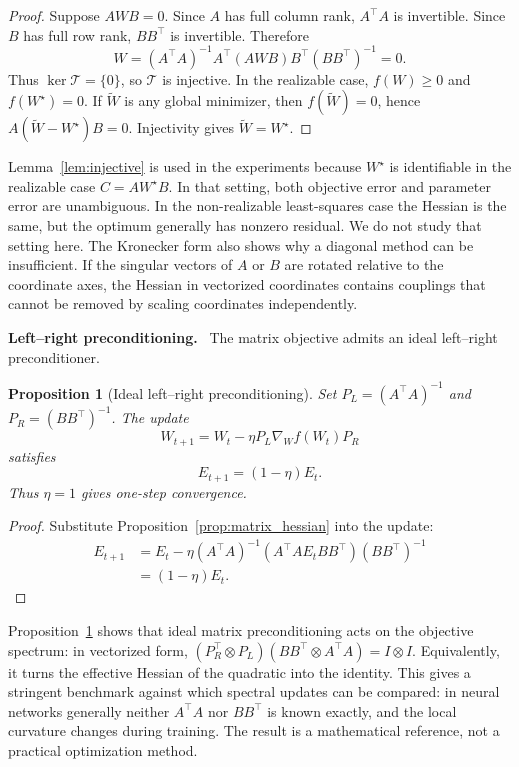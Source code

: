 \documentclass[sigconf,nonacm]{acmart}
\newcommand{\vpara}[1]{\par\noindent\textbf{#1.}\ }
\newtheorem{proposition}{Proposition}
\begin{document}
\begin{proof}
Suppose $AWB=0$. Since $A$ has full column rank, $A^\top A$ is invertible. Since $B$ has full row rank, $BB^\top$ is invertible. Therefore
\begin{equation}
  W=(A^\top A)^{-1}A^\top(AWB)B^\top(BB^\top)^{-1}=0.
\end{equation}
Thus $\ker\mathcal{T}=\{0\}$, so $\mathcal{T}$ is injective. In the realizable case, $f(W)\ge0$ and $f(W^\star)=0$. If $\widetilde W$ is any global minimizer, then $f(\widetilde W)=0$, hence $A(\widetilde W-W^\star)B=0$. Injectivity gives $\widetilde W=W^\star$.
\end{proof}

Lemma~\ref{lem:injective} is used in the experiments because $W^\star$ is identifiable in the realizable case $C=AW^\star B$. In that setting, both objective error and parameter error are unambiguous. In the non-realizable least-squares case the Hessian is the same, but the optimum generally has nonzero residual. We do not study that setting here. The Kronecker form also shows why a diagonal method can be insufficient. If the singular vectors of $A$ or $B$ are rotated relative to the coordinate axes, the Hessian in vectorized coordinates contains couplings that cannot be removed by scaling coordinates independently.

\vpara{Left--right preconditioning} The matrix objective admits an ideal left--right preconditioner.

\begin{proposition}[Ideal left--right preconditioning]\label{prop:lr}
Set $P_L=(A^\top A)^{-1}$ and $P_R=(BB^\top)^{-1}$. The update
\begin{equation}
  W_{t+1}=W_t-\eta P_L\nabla_W f(W_t)P_R
\end{equation}
satisfies
\begin{equation}
  E_{t+1}=(1-\eta)E_t.
\end{equation}
Thus $\eta=1$ gives one-step convergence.
\end{proposition}

\begin{proof}
Substitute Proposition~\ref{prop:matrix_hessian} into the update:
\begin{align}
E_{t+1}
&=E_t-\eta(A^\top A)^{-1}(A^\top A E_t BB^\top)(BB^\top)^{-1}\\
&=(1-\eta)E_t .
\end{align}
\end{proof}

Proposition~\ref{prop:lr} shows that ideal matrix preconditioning acts on the objective spectrum: in vectorized form, $(P_R^\top\otimes P_L)(BB^\top\otimes A^\top A)=I\otimes I$. Equivalently, it turns the effective Hessian of the quadratic into the identity. This gives a stringent benchmark against which spectral updates can be compared: in neural networks generally neither $A^\top A$ nor $BB^\top$ is known exactly, and the local curvature changes during training. The result is a mathematical reference, not a practical optimization method.
\end{document}

